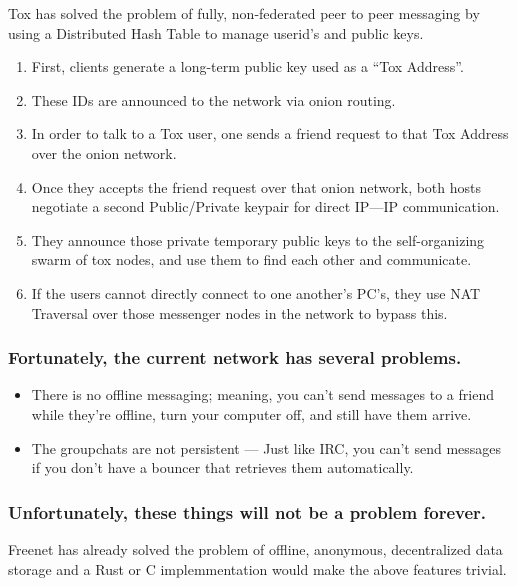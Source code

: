 \documentclass{beamer}
\begin{document}
  \begin{frame}
      Tox has solved the problem of fully, non-federated peer to peer messaging by using a Distributed Hash Table to manage userid's and public keys.
      \begin{enumerate}
        \item First, clients generate a long-term public key used as a ``Tox Address''.
        \item These IDs are announced to the network via onion routing.
        \item In order to talk to a Tox user, one sends a friend request to that Tox Address over the onion network.
        \item Once they accepts the friend request over that onion network, both hosts negotiate a second Public/Private keypair for direct IP---IP communication.
        \item They announce those private temporary public keys to the self-organizing swarm of tox nodes, and use them to find each other and communicate.
        \item If the users cannot directly connect to one another's PC's, they use NAT Traversal over those messenger nodes in the network to bypass this.
      \end{enumerate}
  \end{frame}
  \begin{frame}
      \frametitle{Fortunately, the current network has several problems.}
      \begin{itemize}
          \item There is no offline messaging; meaning, you can't send messages to a friend while they're offline, turn your computer off, and still have them arrive.
          \item The groupchats are not persistent --- Just like IRC, you can't send messages if you don't have a bouncer that retrieves them automatically.
      \end{itemize}
  \end{frame}
  \begin{frame}
      \frametitle{Unfortunately, these things will not be a problem forever.}
      Freenet has already solved the problem of offline, anonymous, decentralized data storage and a Rust or C implemmentation would make the above features trivial.
  \end{frame}
\end{document}
